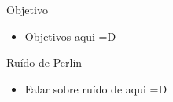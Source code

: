 
\begin{frame}{Objetivo}
  \begin{itemize}
    \item Objetivos aqui =D
  \end{itemize}
\end{frame}

\begin{frame}{Ruído de Perlin}
  \begin{itemize}\setlength\itemsep{1em}
    \item Falar sobre ruído de  \cite{perlin2002improving} aqui =D    
  \end{itemize}
\end{frame}

